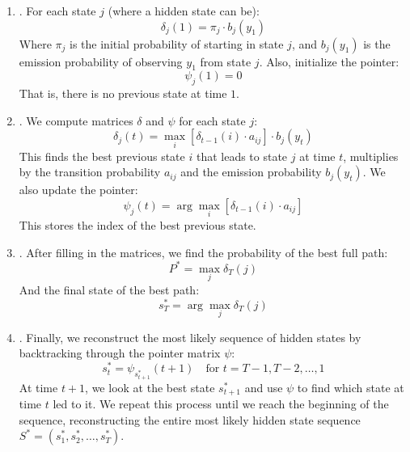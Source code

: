 \begin{enumerate}
    \item {}. For each state $j$ (where a hidden state can be):
    \begin{equation*}
        \delta_j(1) = \pi_j \cdot b_j(y_1)
    \end{equation*}
    Where $\pi_j$ is the initial probability of starting in state $j$, and $b_j(y_1)$ is the emission probability of observing $y_1$ from state $j$. Also, initialize the pointer:
    \begin{equation*}
        \psi_j(1) = 0
    \end{equation*}
    That is, there is no previous state at time $1$.


    \item {}. We compute matrices $\delta$ and $\psi$ for each state $j$:
    \begin{equation*}
        \delta_j(t) = \max_{i} \left[\delta_{t-1}(i) \cdot a_{ij}\right] \cdot b_j(y_t)
    \end{equation*}
    This finds the best previous state $i$ that leads to state $j$ at time $t$, multiplies by the transition probability $a_{ij}$ and the emission probability $b_j(y_t)$. We also update the pointer:
    \begin{equation*}
        \psi_j(t) = \arg\max_{i} \left[\delta_{t-1}(i) \cdot a_{ij}\right]
    \end{equation*}
    This stores the index of the best previous state.


    \item {}. After filling in the matrices, we find the probability of the best full path:
    \begin{equation*}
        P^* = \max_{j} \delta_T(j)
    \end{equation*}
    And the final state of the best path:
    \begin{equation*}
        s_T^* = \arg\max_{j} \delta_T(j)
    \end{equation*}


    \item {}. Finally, we reconstruct the most likely sequence of hidden states by backtracking through the pointer matrix $\psi$:
    \begin{equation*}
        s_t^* = \psi_{s_{t+1}^*}(t+1) \quad \text{for } t = T-1, T-2, \ldots, 1
    \end{equation*}
    At time $t+1$, we look at the best state $s_{t+1}^*$ and use $\psi$ to find which state at time $t$ led to it. We repeat this process until we reach the beginning of the sequence, reconstructing the entire most likely hidden state sequence $S^* = (s_1^*, s_2^*, \ldots, s_T^*)$.
\end{enumerate}

